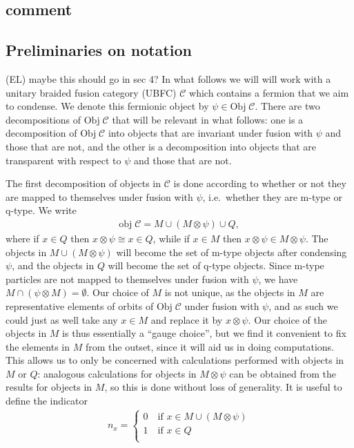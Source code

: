 \documentclass[12pt,a4paper]{article}
\newcommand{\tp}{\otimes}
\newcommand{\mcc}{\mathcal{C}}
\newcommand{\ethan}[1]{{\color{amethyst}\footnotesize{(EL) #1}}}
\begin{document}
 
 


 
\subsection{comment}
\subsection{Preliminaries on notation}
\ethan{maybe this should go in sec 4?}
In what follows we will will work with a unitary braided fusion category (UBFC) $\mathcal{C}$ which contains a fermion that we aim to condense. 
We denote this fermionic object by $\psi \in \text{Obj}\; \mathcal{C}$. 
There are two decompositions of $\text{Obj}\; \mathcal{C}$ that will be relevant in what follows: one is a decomposition of $\text{Obj}\; \mathcal{C}$ into objects that are invariant under fusion with $\psi$ and those that are not, and the other is a decomposition into objects  that are transparent with respect to $\psi$ and those that are not. 

The first decomposition of objects in $\mcc$ is done according to whether or not they are mapped to themselves under fusion with $\psi$, i.e.\ whether they are m-type or q-type.
We write
\begin{align} \label{MQ_partition}
\text{obj} \; \mathcal{C}  = M \cup  (M \tp \psi) \cup Q,
\end{align}
where if $x \in Q$ then $x \tp \psi \cong x \in Q$, while if $x \in M$ then $x \tp \psi \in M \tp \psi $.
The objects in $M \cup (M\tp \psi)$ will become the set of m-type objects after condensing $\psi$, and the objects in $Q$ will become the set of q-type objects.  
Since m-type particles are not mapped to themselves under fusion with $\psi$, we have $M\cap (\psi\tp M) = \emptyset$. 
Our choice of $M$ is not unique, as the objects in $M$ are representative elements of orbits of $\text{Obj}\; \mcc$ under fusion with $\psi$, and as such we could just as well take any $x \in M$ and replace it by $x \tp \psi$.
Our choice of the objects in $M$ is thus essentially a ``gauge choice'', but we find it convenient to fix the elements in $M$ from the outset, since it will aid us in doing computations. 
This allows us to only be concerned with calculations performed with objects in $M$ or $Q$: analogous calculations for objects in $M\tp \psi$ can be obtained from the results for objects in $M$, so this is done without loss of generality. 
It is useful to define the indicator
\begin{align}
n_x=
\begin{cases}
0\quad \text{if $x \in M \cup (M\tp \psi)$}\\
1\quad \text{if $x \in Q$}\\
\end{cases}
\end{align}
\end{document}
